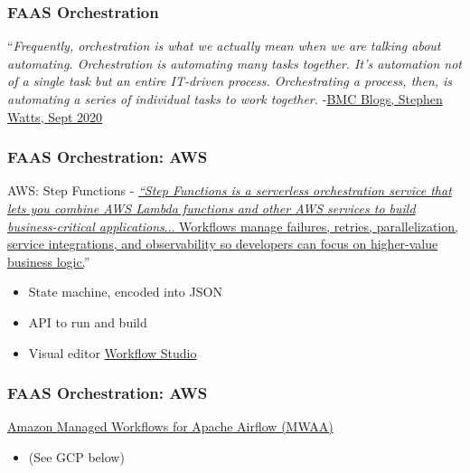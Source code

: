 \documentclass[11pt,aspectratio=169]{beamer}
\begin{document}
\begin{nrcanFrame}
  \frametitle{FAAS Orchestration}
  ``\textit{Frequently, orchestration is what we actually mean when we
    are talking about automating. Orchestration is automating many
    tasks together. It’s automation not of a single task but an entire
    IT-driven process. Orchestrating a process, then, is automating a
    series of individual tasks to work together.}
  -\href{https://www.bmc.com/blogs/it-orchestration-vs-automation-whats-the-difference/}
       {BMC Blogs, Stephen Watts, Sept 2020}
\end{nrcanFrame}

\begin{nrcanFrame}
  \frametitle{FAAS Orchestration: AWS}
  AWS: Step Functions -
  \href{https://docs.aws.amazon.com/step-functions/index.html}{\textit{``Step Functions is a serverless
      orchestration service that lets you combine AWS Lambda functions
      and other AWS services to build business-critical
      applications}...\href{https://aws.amazon.com/step-functions/?step-functions.sort-by=item.additionalFields.postDateTime&step-functions.sort-order=desc}{
      Workflows \alert{manage failures, retries, parallelization,}
      service integrations, and observability so developers can
      focus on higher-value business logic.}}''
  \begin{itemize}
  \item State machine, encoded into JSON
  \item API to run \alert{and build}
  \item Visual editor
    \href{https://docs.aws.amazon.com/step-functions/latest/dg/workflow-studio.html}
         {Workflow Studio}
  \end{itemize}
\end{nrcanFrame}

\begin{nrcanFrame}
  \frametitle{FAAS Orchestration: AWS}
  \href{https://aws.amazon.com/managed-workflows-for-apache-airflow/}
      {Amazon Managed Workflows for Apache Airflow (MWAA)}
      \begin{itemize}
      \item (See GCP below)
      \end{itemize}
\end{nrcanFrame}
\end{document}
